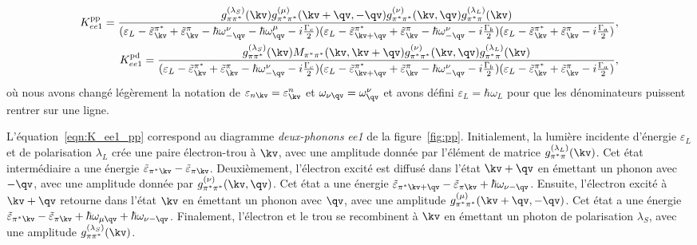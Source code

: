 \begin{align}
    K_{ee1}^{\text{pp}} = \frac{g^{(\lambda_S)}_{\pi\pi^*}(\kv)g^{(\mu)}_{\pi^*\pi^*}(\kv+\qv,-\qv)g_{\pi^*\pi^*}^{(\nu)}(\kv,\qv)g_{\pi^*\pi}^{(\lambda_L)}(\kv)}{(\varepsilon_L-\tilde{\varepsilon}_\kv^{\pi^*}+\tilde{\varepsilon}_\kv^\pi-\hbar\omega_{-\qv}^\nu-\hbar\omega_\qv^\mu-i\frac{\Gamma_c}{2})(\varepsilon_L-\tilde{\varepsilon}_{\kv+\qv}^{\pi^*}+\tilde{\varepsilon}_\kv^\pi-\hbar\omega_{-\qv}^\nu-i\frac{\Gamma_b}{2})(\varepsilon_L-\tilde{\varepsilon}_\kv^{\pi^*}+\tilde{\varepsilon}_{\kv}^\pi-i\frac{\Gamma_a}{2})},\label{eqn:K_ee1_pp}\\
    K_{ee1}^{\text{pd}} = \frac{g^{(\lambda_S)}_{\pi\pi^*}(\kv)M_{\pi^*\pi^*}(\kv,\kv+\qv)g^{(\nu)}_{\pi^*\pi^*}(\kv,\qv)g_{\pi^*\pi}^{(\lambda_L)}(\kv)}{(\varepsilon_L-\tilde{\varepsilon}^{\pi^*}_\kv+\tilde{\varepsilon}^\pi_\kv-\hbar\omega_{-\qv}^\nu-i\frac{\Gamma_c}{2})(\varepsilon_L-\tilde{\varepsilon}_{\kv+\qv}^{\pi^*}+\tilde{\varepsilon}_\kv^\pi-\hbar\omega_{-\qv}^\nu-i\frac{\Gamma_b}{2})(\varepsilon_L-\tilde{\varepsilon}_\kv^{\pi^*}+\tilde{\varepsilon}_\kv^\pi-i\frac{\Gamma_a}{2})},\label{eqn:K_ee1_pd}
\end{align}
où nous avons changé légèrement la notation de $\varepsilon_{n\kv}=\varepsilon_\kv^n$ et $\omega_{\nu\qv} = \omega_\qv^\nu$ et avons défini $\varepsilon_L=\hbar\omega_L$ pour que les dénominateurs puissent rentrer sur une ligne.

L'équation~\eqref{eqn:K_ee1_pp} correspond au diagramme \textit{deux-phonons} \textit{ee1} de la figure~\ref{fig:pp}. Initialement, la lumière incidente d'énergie $\varepsilon_L$ et de polarisation $\lambda_L$ crée une paire électron-trou à $\kv$, avec une amplitude donnée par l'élément de matrice $g_{\pi^*\pi}^{(\lambda_L)}(\kv)$. Cet état intermédiaire a une énergie $\tilde{\varepsilon}_{\pi^*\kv}-\tilde{\varepsilon}_{\pi\kv}$. Deuxièmement, l'électron excité est diffusé dans l'état $\kv+\qv$ en émettant un phonon avec $-\qv$, avec une amplitude donnée par $g_{\pi^*\pi^*}^{(\nu)}(\kv,\qv)$. Cet état a une énergie $\tilde{\varepsilon}_{\pi^*\kv+\qv}-\tilde{\varepsilon}_{\pi\kv}+\hbar\omega_{\nu-\qv}$. Ensuite, l'électron excité à $\kv+\qv$ retourne dans l'état $\kv$ en émettant un phonon avec $\qv$, avec une amplitude $g_{\pi^*\pi^*}^{(\mu)}(\kv+\qv,-\qv)$. Cet état a une énergie $\tilde{\varepsilon}_{\pi^*\kv}-\tilde{\varepsilon}_{\pi\kv}+\hbar\omega_{\mu\qv}+\hbar\omega_{\nu-\qv}$. Finalement, l'électron et le trou se recombinent à $\kv$ en émettant un photon de polarisation $\lambda_S$, avec une amplitude $g^{(\lambda_S)}_{\pi\pi^*}(\kv)$.

